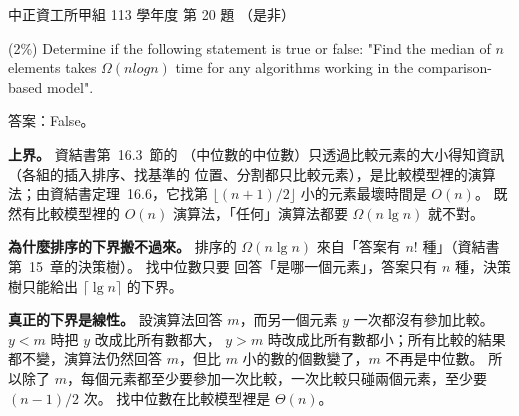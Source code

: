 \begin{pastexam}[label={px:ccu-113-swa-15}]{中正資工所甲組 113 學年度 第 20 題}
（是非）

(2\%) Determine if the following statement is true or false: "Find the median of $n$ elements takes $\Omega(nlogn)$ time for any algorithms working in the comparison-based model".
\end{pastexam}

\begin{pastsoln}
答案：False。

\textbf{上界。} 資結書第~16.3~節的 （中位數的中位數）只透過比較元素的大小得知資訊（各組的插入排序、找基準的
位置、分割都只比較元素），是比較模型裡的演算法；由資結書定理~16.6，它找第 $\lfloor (n+1)/2 \rfloor$ 小的元素最壞時間是
$O(n)$。 既然有比較模型裡的 $O(n)$ 演算法，「任何」演算法都要 $\Omega(n \lg n)$ 就不對。

\textbf{為什麼排序的下界搬不過來。} 排序的 $\Omega(n \lg n)$ 來自「答案有 $n!$ 種」（資結書第~15~章的決策樹）。 找中位數只要
回答「是哪一個元素」，答案只有 $n$ 種，決策樹只能給出 $\lceil \lg n \rceil$ 的下界。

\textbf{真正的下界是線性。} 設演算法回答 $m$，而另一個元素 $y$ 一次都沒有參加比較。 $y < m$ 時把 $y$ 改成比所有數都大，
$y > m$ 時改成比所有數都小；所有比較的結果都不變，演算法仍然回答 $m$，但比 $m$ 小的數的個數變了，$m$ 不再是中位數。
所以除了 $m$，每個元素都至少要參加一次比較，一次比較只碰兩個元素，至少要 $(n-1)/2$ 次。 找中位數在比較模型裡是
$\Theta(n)$。
\end{pastsoln}
